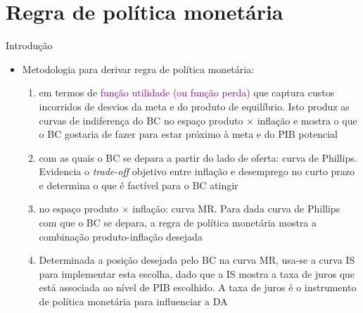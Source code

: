 \documentclass[10pt]{beamer}
\begin{document}
\section{Regra de política monetária}
\begin{frame}
    {Introdução}
    \begin{itemize}
        \item Metodologia para derivar regra de política monetária:\medskip
        \begin{enumerate}
            \item {} em termos de \textcolor{purple}{função utilidade (ou função perda)} que captura custos incorridos de desvios da meta e do produto de equilíbrio. Isto produz as curvas de indiferença do BC no espaço produto $\times$ inflação e mostra o que o BC gostaria de fazer para estar próximo à meta e do PIB potencial\medskip
            \item {} com as quais o BC se depara a partir do lado de oferta: curva de Phillips. Evidencia o \emph{trade-off} objetivo entre inflação e desemprego no curto prazo e determina o que é factível para o BC atingir\medskip
            \item {} no espaço produto $\times$ inflação: curva MR. Para dada curva de Phillips com que o BC se depara, a regra de política monetária mostra a combinação produto-inflação desejada\medskip
            \item Determinada a posição desejada pelo BC na curva MR, usa-se a curva IS para implementar esta escolha, dado que a IS mostra a taxa de juros que está associada ao nível de PIB escolhido. A taxa de juros é o instrumento de política monetária para influenciar a DA
        \end{enumerate}
    \end{itemize}
\end{frame}
\end{document}
